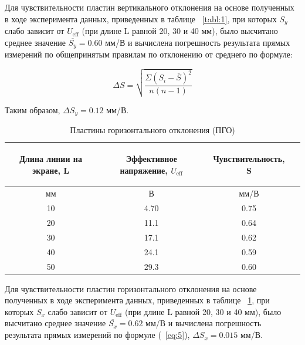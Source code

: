 Для чувствительности пластин вертикального отклонения на основе полученных в ходе эксперимента данных, приведенных в таблице ~\ref{tabl:1}, при которых $S_y$ слабо зависит от $U_{\text{eff}}$ (при длине L равной 20, 30 и 40 мм), было высчитано среднее значение $\overline{S_y} = 0.60$ мм/В и вычислена погрешность результата прямых измерений по общепринятым правилам по отклонению от среднего по формуле:

\begin{equation}
\label{eq:5}
   \Delta S=\sqrt{\frac{\Sigma{(S_i-\overline{S})^2}}{n(n-1)}}
\end{equation}

Таким образом, $\Delta S_y = 0.12$ мм/В.

\begin{center}
\begin{table}[H]
\centering
\caption{Пластины горизонтального отклонения (ПГО)}
\label{tabl:2}
\renewcommand{\arraystretch}{1.15}
\begin{tabular}{|c|c|c|c|}
\hline
\begin{minipage}{5cm}
\begin{center}
    Длина линии на экране, L
\end{center}
\end{minipage} &
\begin{minipage}{5cm}
\begin{center}
    Эффективное напряжение, $U_{\text{eff}}$
\end{center}
\end{minipage} &
\begin{minipage}{5cm}
\begin{center}
    Чувствительность, S
\end{center}
\end{minipage}\\
\hline
мм&В&мм/В\\
\hline
10  &  4.70  &  0.75 \\
20  &  11.1  &  0.64 \\
30  &  17.1  &  0.62 \\
40  &  24.1  &  0.59 \\
50  &  29.3  &  0.60 \\
\hline
\end{tabular}
\end{table}
\end{center}

Для чувствительности пластин горизонтального отклонения на основе полученных в ходе эксперимента данных, приведенных в таблице ~\ref{tabl:2}, при которых $S_x$ слабо зависит от $U_{\text{eff}}$ (при длине L равной 20, 30 и 40 мм), было высчитано среднее значение $\overline{S_x} = 0.62$ мм/В и вычислена погрешность результата прямых измерений по формуле (~\ref{eq:5}), $\Delta S_x = 0.015$ мм/В.

